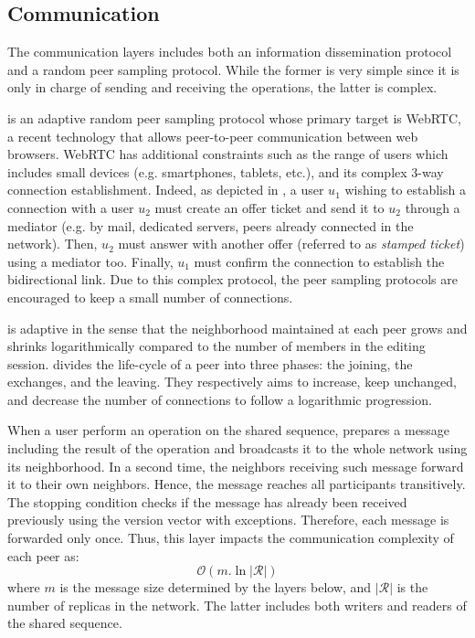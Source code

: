\subsection{Communication}
The communication layers includes both an information dissemination protocol and
a random peer sampling protocol. While the former is very simple since it is
only in charge of sending and receiving the operations, the latter is complex.

\SPRAY is an adaptive random peer sampling protocol whose primary target is
WebRTC, a recent technology that allows peer-to-peer communication between web
browsers. WebRTC has additional constraints such as the range of users which
includes small devices (e.g. smartphones, tablets, etc.), and its complex 3-way
connection establishment. Indeed, as depicted in , a user $u_1$
wishing to establish a connection with a user $u_2$ must create an offer ticket
and send it to $u_2$ through a mediator (e.g. by mail, dedicated servers, peers
already connected in the network). Then, $u_2$ must answer with another offer
(referred to as \emph{stamped ticket}) using a mediator too. Finally, $u_1$ must
confirm the connection to establish the bidirectional link. Due to this complex
protocol, the peer sampling protocols are encouraged to keep a small number of
connections.

\SPRAY is adaptive in the sense that the neighborhood maintained at each peer
grows and shrinks logarithmically compared to the number of members in the
editing session. \SPRAY divides the life-cycle of a peer into three phases: the
joining, the exchanges, and the leaving. They respectively aims to increase,
keep unchanged, and decrease the number of connections to follow a logarithmic
progression.
  
When a user perform an operation on the shared sequence, \CRATE prepares a
message including the result of the operation and broadcasts it to the whole
network using its neighborhood. In a second time, the neighbors receiving such
message forward it to their own neighbors. Hence, the message reaches all
participants transitively. The stopping condition checks if the message has
already been received previously using the version vector with
exceptions. Therefore, each message is forwarded only once. Thus, this layer
impacts the communication complexity of each peer as:
\begin{equation}
  \mathcal{O}(m.\ln |\mathcal{R}| )
\end{equation}
where $m$ is the message size determined by the layers below, and
$|\mathcal{R}|$ is the number of replicas in the network. The latter includes
both writers and readers of the shared sequence.
  

